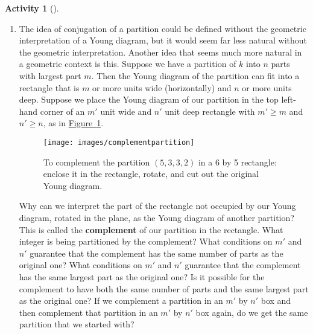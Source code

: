 \documentclass[10pt,]{book}
\newcommand{\terminology}[1]{\textbf{#1}}
\theoremstyle{plain}
\theoremstyle{definition}
\newtheorem{activity}[project]{Activity}
\numberwithin{equation}{chapter}
\begin{document}
\begin{activity}[]
\begin{enumerate}[label=(\alph*)]
~\par
\item The idea of conjugation of a partition could be defined without the geometric interpretation of a Young diagram, but it would seem far less natural without the geometric interpretation. Another idea that seems much more natural in a geometric context is this. Suppose we have a partition of \(k\) into \(n\) parts with largest part \(m\). Then the Young diagram of the partition can fit into a rectangle that is \(m\) or more units wide (horizontally) and \(n\) or more units deep. Suppose we place the Young diagram of our partition in the top left-hand corner of an \(m'\) unit wide and \(n'\) unit deep rectangle with \(m'\ge m\) and \(n' \ge n\), as in \hyperref[complementpartition]{Figure~\ref{complementpartition}}.%
\begin{figure}
\centering
\texttt{[image: images/complementpartition]}
\caption{To complement the partition \((5,3,3,2)\) in a 6 by 5 rectangle: enclose it in the rectangle, rotate, and cut out the original Young diagram.\label{complementpartition}}
\end{figure}
Why can we interpret the part of the rectangle not occupied by our Young diagram, rotated in the plane, as the Young diagram of another partition? This is called the \terminology{complement} of our partition in the rectangle. What integer is being partitioned by the complement? What conditions on \(m'\) and \(n'\) guarantee that the complement has the same number of parts as the original one? What conditions on \(m'\) and \(n'\) guarantee that the complement has the same largest part as the original one? Is it possible for the complement to have both the same number of parts and the same largest part as the original one? If we complement a partition in an \(m'\) by \(n'\) box and then complement that partition in an \(m'\) by \(n'\) box again, do we get the same partition that we started with?%
\par\medskip\noindent%

\end{enumerate}
\end{activity}
\end{document}
